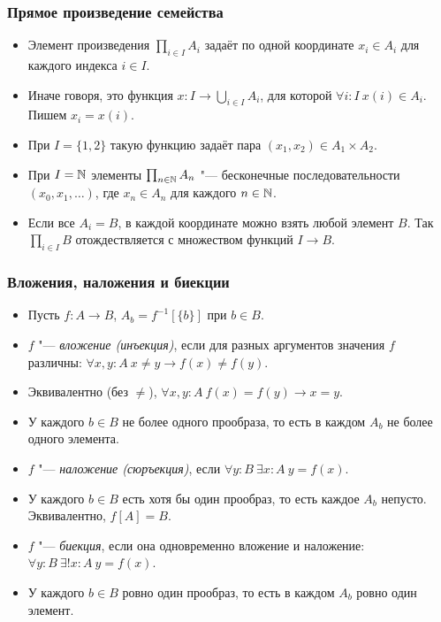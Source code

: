 \documentclass[10pt]{beamer}
\begin{document}
\begin{frame}
    \frametitle{Прямое произведение семейства}
    \begin{itemize}
        \item Элемент произведения $\prod_{i\in I}A_i$ задаёт по одной координате $x_i\in A_i$ для каждого индекса $i\in I$.
        \item Иначе говоря, это функция $x:I\to\bigcup_{i\in I}A_i$, для которой $\forall i:I~x(i)\in A_i$. Пишем $x_i=x(i)$.
        \pause
        \item При $I=\{1,2\}$ такую функцию задаёт пара $(x_1,x_2)\in A_1\times A_2$.
        \pause
        \item При $I=\mathbb{N}$ элементы $\prod_{n\in\mathbb{N}}A_n$ "--- бесконечные последовательности $(x_0,x_1,\ldots)$, где $x_n\in A_n$ для каждого $n\in\mathbb{N}$.
        \pause
        \item Если все $A_i=B$, в каждой координате можно взять любой элемент $B$. Так $\prod_{i\in I}B$ отождествляется с множеством функций $I\to B$.
    \end{itemize}
\end{frame}

\begin{frame}
    \frametitle{Вложения, наложения и биекции}
    \begin{itemize}
        \item Пусть $f:A\to B$, $A_b=f^{-1}[\{b\}]$ при $b\in B$.
        \item $f$ "--- \emph{вложение (инъекция)}, если для разных аргументов значения $f$ различны: $\forall x,y:A~x \neq y \to f(x) \neq f(y)$.
        \item Эквивалентно (без $\neq$), \pause $\forall x,y:A~f(x)=f(y)\to x=y$.
        \item У каждого $b\in B$ не более одного прообраза, то есть в каждом $A_b$ не более одного элемента.
        \pause
        \item $f$ "--- \emph{наложение (сюръекция)}, если $\forall y:B~\exists x:A~y=f(x)$.
        \item У каждого $b\in B$ есть хотя бы один прообраз, то есть каждое $A_b$ непусто. Эквивалентно, $f[A]=B$.
        \pause
        \item $f$ "--- \emph{биекция}, если она одновременно вложение и наложение: $\forall y:B~\exists!x:A~y=f(x)$.
        \item У каждого $b\in B$ ровно один прообраз, то есть в каждом $A_b$ ровно один элемент.
    \end{itemize}
\end{frame}
\end{document}
